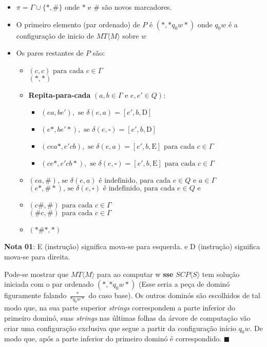 \documentclass[12pt, a4paper]{article}
\begin{document}
\begin{itemize}
\item $\pi = \Gamma \cup \lbrace*, \# \rbrace$ onde $* \text{ e } \#$ são novos marcadores.
\item O primeiro elemento (par ordenado) de $P$ é $(*, *q_{0}w*)$ onde $q_{0}w$ é a configuração de inicio de $MT \langle M \rangle$ sobre $w$
\item Os pares restantes de $P$ são:
  \begin{itemize}
    \item $(c, c) \text{ para cada } c \in \Gamma$ \\
             $(*, *)$
    \item \textbf{Repita-para-cada} $(a, b \in \Gamma \text{ e } e, e' \in Q)$:
      \begin{itemize}
        \item $(ea, be'),  \text{ se } \delta(e, a)  = [e', b, \text{D}]$
        \item $(e*, be'*), \text{ se } \delta(e, \square)  = [e', b, \text{D}]$
        \item $(cea*, e'cb), \text{ se } \delta(e, a)  = [e', b, \text{E}] \text{ para cada } c \in \Gamma$
        \item $(ce*, e'cb*), \text{ se } \delta(e, \square)  = [e', b, \text{E}] \text{ para cada } c \in \Gamma$
      \end{itemize}
    \item $(ea, \#) \text{, se } \delta(e, a) \text{ é indefinido, para cada } e \in Q \text{ e } a \in \Gamma$ \\
             $(e*, \#*) \text{, se } \delta(e, \square) \text{ é indefinido, para cada } e \in Q \text{ e }$
    \item $(c\#, \#) \text{ para cada } c \in \Gamma$ \\
             $(\#c, \#) \text{ para cada } c \in \Gamma$
    \item $(*\#*, *)$
  \end{itemize}
\end{itemize}

\qquad \textbf{Nota 01}: E (instrução) significa mova-se para esquerda. e D (instrução) significa mova-se para direita.

\qquad Pode-se mostrar que $MT\langle M \rangle$ para ao computar w \textbf{sse} $SCP \langle S \rangle$ tem solução iniciada com o par ordenado $(*, *q_{0}w*)$ (Esse seria a peça de dominó figuramente falando $\frac{*}{*q_{0}w*} $ do caso base). Os outros dominós são escolhidos de tal modo que, na sua parte superior \textit{strings} correspondem a parte inferior do primeiro dominó, suas \textit{strings} nas últimas folhas da árvore de computação vão criar uma configuração exclusiva que segue a partir da configuração início $q_{0}w$. De modo que, após a parte inferior do primeiro dominó é correspondido. $\blacksquare$ \cite{newton04}
\end{document}
